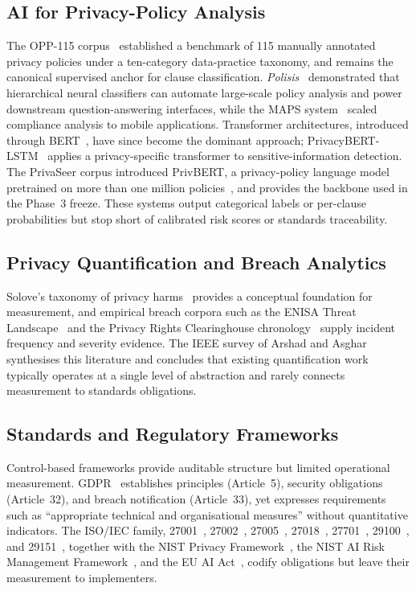 \documentclass[conference]{IEEEtran}
\begin{document}
\subsection{AI for Privacy-Policy Analysis}
The OPP-115 corpus~\cite{wilson2016opp115} established a benchmark of 115
manually annotated privacy policies under a ten-category data-practice
taxonomy, and remains the canonical supervised anchor for clause
classification. \emph{Polisis}~\cite{harkous2018polisis} demonstrated that
hierarchical neural classifiers can automate large-scale policy analysis and
power downstream question-answering interfaces, while the MAPS
system~\cite{zimmeck2019maps} scaled compliance analysis to mobile
applications. Transformer architectures, introduced through
BERT~\cite{devlin2019bert}, have since become the dominant approach;
PrivacyBERT-LSTM~\cite{muralitharan2024privacybertlstm} applies a
privacy-specific transformer to sensitive-information detection. The
PrivaSeer corpus introduced PrivBERT, a privacy-policy language model
pretrained on more than one million policies~\cite{srinath2021privaseer},
and provides the backbone used in the Phase~3 freeze. These systems output
categorical labels or per-clause probabilities but stop short of calibrated
risk scores or standards traceability.

\subsection{Privacy Quantification and Breach Analytics}
Solove's taxonomy of privacy harms~\cite{solove2006taxonomy} provides a
conceptual foundation for measurement, and empirical breach corpora such as
the ENISA Threat Landscape~\cite{enisa_tl_2024} and the Privacy Rights
Clearinghouse chronology~\cite{prc_breaches} supply incident frequency and
severity evidence. The IEEE survey of Arshad and
Asghar~\cite{arshad2024characterisation} synthesises this literature and
concludes that existing quantification work typically operates at a single
level of abstraction and rarely connects measurement to standards
obligations.

\subsection{Standards and Regulatory Frameworks}
Control-based frameworks provide auditable structure but limited
operational measurement. GDPR~\cite{gdpr2016} establishes principles
(Article~5), security obligations (Article~32), and breach notification
(Article~33), yet expresses requirements such as ``appropriate technical and
organisational measures'' without quantitative indicators. The ISO/IEC
family, 27001~\cite{iso27001_2022}, 27002~\cite{iso27002_2022},
27005~\cite{iso27005_2022}, 27018~\cite{iso27018_2019},
27701~\cite{iso27701_2019}, 29100~\cite{iso29100_2011}, and
29151~\cite{iso29151_2017}, together with the NIST Privacy
Framework~\cite{nist_pf_2020}, the NIST AI Risk Management
Framework~\cite{nist_aiRMF_2023}, and the EU AI Act~\cite{eu_ai_act_2024},
codify obligations but leave their measurement to implementers.
\end{document}

